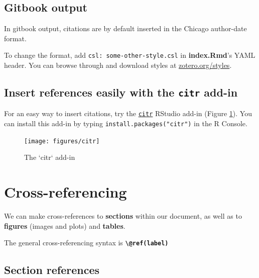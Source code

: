 \documentclass[a4paper, twoside]{templates/ociamthesis}
\begin{document}
\hypertarget{gitbook-output}{%
\subsection{Gitbook output}\label{gitbook-output}}

In gitbook output, citations are by default inserted in the Chicago author-date format.

To change the format, add \texttt{csl:\ some-other-style.csl} in \textbf{index.Rmd}'s YAML header.
You can browse through and download styles at \href{https://www.zotero.org/styles}{zotero.org/styles}.

\clearpage

\hypertarget{insert-references-easily-with-the-citr-add-in}{%
\subsection{\texorpdfstring{Insert references easily with the \texttt{citr} add-in}{Insert references easily with the citr add-in}}\label{insert-references-easily-with-the-citr-add-in}}

For an easy way to insert citations, try the \href{https://github.com/crsh/citr}{\texttt{citr}} RStudio add-in (Figure \ref{fig:citr}).
You can install this add-in by typing \texttt{install.packages("citr")} in the R Console.

\begin{figure}

{\centering \texttt{[image: figures/citr]} 

}

\caption{The `citr` add-in}\label{fig:citr}
\end{figure}

\hypertarget{cross-referencing}{%
\section{Cross-referencing}\label{cross-referencing}}

We can make cross-references to \textbf{sections} within our document, as well as to \textbf{figures} (images and plots) and \textbf{tables}.

The general cross-referencing syntax is \textbf{\texttt{\textbackslash{}@ref(label)}}

\hypertarget{section-references}{%
\subsection{Section references}\label{section-references}}
\end{document}
